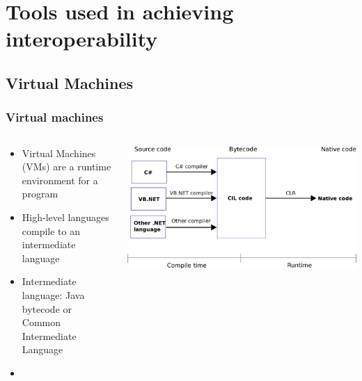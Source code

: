\documentclass{beamer}
\begin{document}
\section[Interop Tools]{Tools used in achieving interoperability}

\subsection{Virtual Machines}

\begin{frame}
  \frametitle{Virtual machines}
  
  \begin{columns}
  \begin{column}{0.6\textwidth}
  \begin{itemize}
	\item Virtual Machines (VMs) are a runtime environment for a program
	\item High-level languages compile to an intermediate language
	\item Intermediate language: Java bytecode or Common Intermediate Language
	\item 
  \end{itemize}
  \end{column}
  
  \begin{column}{0.5\textwidth}
  \includegraphics[width=1\textwidth]{graphics/CLR.png}
    \\
  \end{column}
  \end{columns}
\end{frame}
\end{document}
